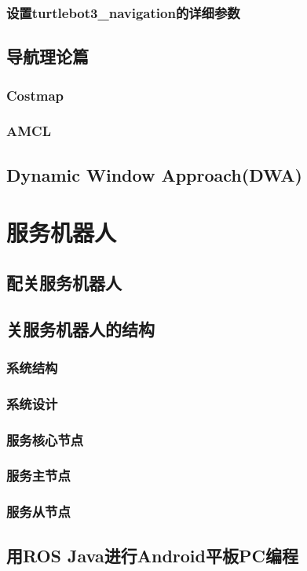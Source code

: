 \documentclass[geye,green,kindle,cn]{elegantnote}
\begin{document}
\subsubsection{设置turtlebot3\_navigation的详细参数}
\subsection{导航理论篇}
\subsubsection{Costmap}
\subsubsection{AMCL}
\subsection{Dynamic Window Approach(DWA)}
\section{服务机器人}
\subsection{配关服务机器人}
\subsection{关服务机器人的结构}
\subsubsection{系统结构}
\subsubsection{系统设计}
\subsubsection{服务核心节点}
\subsubsection{服务主节点}
\subsubsection{服务从节点}
\subsection{用ROS Java进行Android平板PC编程}
\end{document}
